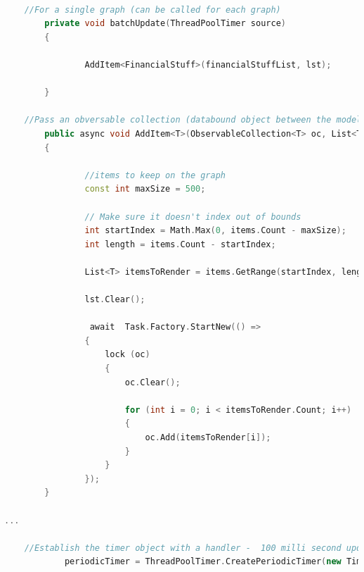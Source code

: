 \documentclass[]{article}
\begin{document}
\begin{lstlisting}[language=C++, caption=Example batch update code ,label={lst:csharpeble}]

	//For a single graph (can be called for each graph)
        private void batchUpdate(ThreadPoolTimer source)
        {
            
                AddItem<FinancialStuff>(financialStuffList, lst);                        

        }

	//Pass an obversable collection (databound object between the model and the view), and a list of items to append to the collection
        public async void AddItem<T>(ObservableCollection<T> oc, List<T> items)
        {

                //items to keep on the graph
                const int maxSize = 500;

                // Make sure it doesn't index out of bounds
                int startIndex = Math.Max(0, items.Count - maxSize);
                int length = items.Count - startIndex;

                List<T> itemsToRender = items.GetRange(startIndex, length);

                lst.Clear();

                 await  Task.Factory.StartNew(() =>                
                {
                    lock (oc)
                    {
                        oc.Clear();

                        for (int i = 0; i < itemsToRender.Count; i++)
                        {
                            oc.Add(itemsToRender[i]);
                        }
                    }
                });
        }

...

	//Establish the timer object with a handler -  100 milli second update
            periodicTimer = ThreadPoolTimer.CreatePeriodicTimer(new TimerElapsedHandler(batchUpdate);, new TimeSpan(0, 0, 0, 0, 100000));
\end{lstlisting}
\end{document}
